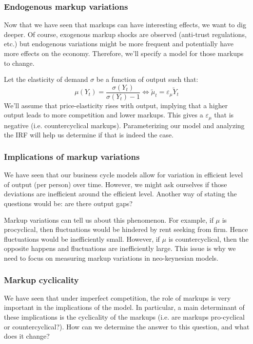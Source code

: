 \documentclass[12pt]{report}
\begin{document}
\subsubsection{Endogenous markup variations}

Now that we have seen that markups can have interesting effects, we want to dig deeper. Of course, exogenous markup shocks are observed (anti-trust regulations, etc.) but endogenous variations might be more frequent and potentially have more effects on the economy. Therefore, we'll specify a model for those markups to change.

Let the elasticity of demand $\sigma$ be a function of output such that: $$\mu(Y_t) = \frac{\sigma(Y_t)}{\sigma(Y_t) - 1} \Leftrightarrow \tilde{\mu}_t = \varepsilon_\mu \tilde{Y}_t $$ We'll assume that price-elasticity rises with output, implying that a higher output leads to more competition and lower markups. This gives a $\varepsilon_\mu$ that is negative (i.e. countercyclical markups). Parameterizing our model and analyzing the IRF will help us determine if that is indeed the case.


\subsubsection{Implications of markup variations}

We have seen that our business cycle models allow for variation in efficient level of output (per person) over time. However, we might ask ourselves if those deviations are inefficient around the efficient level. Another way of stating the questions would be: are there output gaps?

Markup variations can tell us about this phenomenon. For example, if $\mu$ is procyclical, then fluctuations would be hindered by rent seeking from firm. Hence fluctuations would be inefficiently small. However, if $\mu$ is countercyclical, then the opposite happens and fluctuations are inefficiently large. This issue is why we need to focus on measuring markup variations in neo-keynesian models.

\subsubsection{Markup cyclicality}

We have seen that under imperfect competition, the role of markups is very important in the implications of the model. In particular, a main determinant of these implications is the cyclicality of the markups (i.e. are markups pro-cyclical or countercyclical?). How can we determine the answer to this question, and what does it change?
\end{document}
